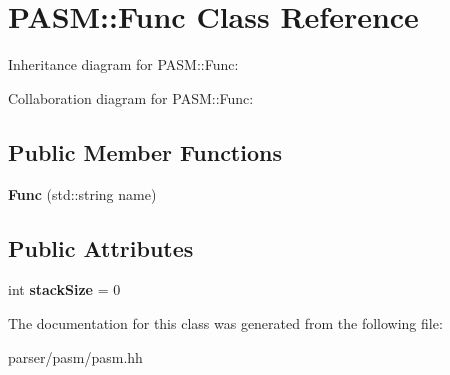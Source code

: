 \hypertarget{classPASM_1_1Func}{}\section{P\+A\+SM\+:\+:Func Class Reference}
\label{classPASM_1_1Func}


Inheritance diagram for P\+A\+SM\+:\+:Func\+:


Collaboration diagram for P\+A\+SM\+:\+:Func\+:
\subsection*{Public Member Functions}
\begin{DoxyCompactItemize}
\item 
\mbox{\label{classPASM_1_1Func_ac15e3e8fbbea1ded490b841bfc59bca0}} 
{\bfseries Func} (std\+::string name)
\end{DoxyCompactItemize}
\subsection*{Public Attributes}
\begin{DoxyCompactItemize}
\item 
\mbox{\label{classPASM_1_1Func_a7a582c0e7a1ad554bf40809615248444}} 
int {\bfseries stack\+Size} = 0
\end{DoxyCompactItemize}


The documentation for this class was generated from the following file\+:\begin{DoxyCompactItemize}
\item 
parser/pasm/pasm.\+hh\end{DoxyCompactItemize}
